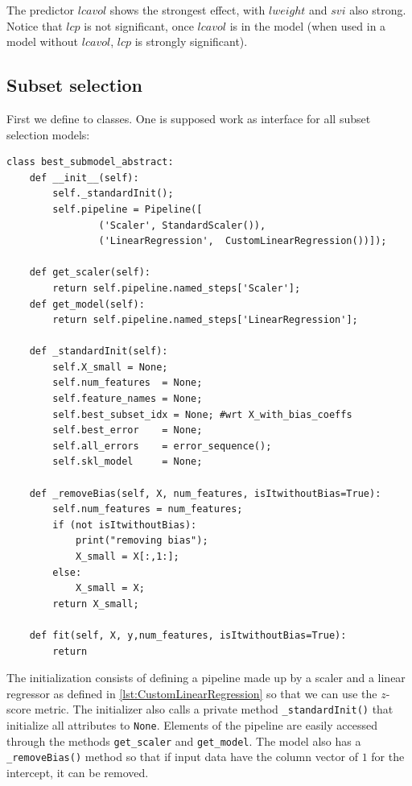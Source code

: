 \documentclass[12pt, letterpaper]{article}
\theoremstyle{definition}
\let\cd\lstinline
\begin{document}
The predictor $lcavol$ shows the strongest effect, with $lweight$ and $svi$ also strong. Notice that $lcp$ is not significant, once $lcavol$ is in the model (when used in a model without $lcavol$, $lcp$ is strongly significant).

\subsection{Subset selection}
First we define to classes. One is supposed work as interface for all subset selection models:
\begin{lstlisting}
class best_submodel_abstract:
    def __init__(self):
        self._standardInit();
        self.pipeline = Pipeline([
                ('Scaler', StandardScaler()), 
                ('LinearRegression',  CustomLinearRegression())]);  
    
    def get_scaler(self):
        return self.pipeline.named_steps['Scaler'];
    def get_model(self):
        return self.pipeline.named_steps['LinearRegression'];
        
    def _standardInit(self):
        self.X_small = None;
        self.num_features  = None;
        self.feature_names = None;
        self.best_subset_idx = None; #wrt X_with_bias_coeffs
        self.best_error    = None;
        self.all_errors    = error_sequence();
        self.skl_model     = None;   
        
    def _removeBias(self, X, num_features, isItwithoutBias=True):
        self.num_features = num_features;
        if (not isItwithoutBias):
            print("removing bias");
            X_small = X[:,1:];
        else:
            X_small = X;
        return X_small;
    
    def fit(self, X, y,num_features, isItwithoutBias=True):
        return
\end{lstlisting}
The initialization consists of defining a pipeline made up by a scaler and a linear regressor as defined in 
\autoref{lst:CustomLinearRegression} so that we can use the $z$-score metric. The initializer also calls a private method \cd+_standardInit()+ that initialize all attributes to \cd+None+. Elements of the pipeline are easily accessed through the methods \cd+get_scaler+ and \cd+get_model+.  The model also has a \cd+_removeBias()+ method so that if input data have the column vector of $1$ for the intercept, it can be removed.
\end{document}
